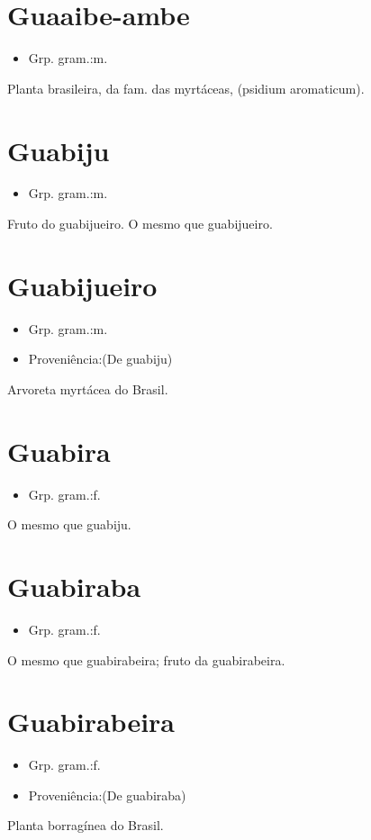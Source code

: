 \section{Guaaibe-ambe}
\begin{itemize}
\item {Grp. gram.:m.}
\end{itemize}
Planta brasileira, da fam. das myrtáceas, (\textunderscore psidium aromaticum\textunderscore ).
\section{Guabiju}
\begin{itemize}
\item {Grp. gram.:m.}
\end{itemize}
Fruto do guabijueiro.
O mesmo que \textunderscore guabijueiro\textunderscore .
\section{Guabijueiro}
\begin{itemize}
\item {Grp. gram.:m.}
\end{itemize}
\begin{itemize}
\item {Proveniência:(De \textunderscore guabiju\textunderscore )}
\end{itemize}
Arvoreta myrtácea do Brasil.
\section{Guabira}
\begin{itemize}
\item {Grp. gram.:f.}
\end{itemize}
O mesmo que \textunderscore guabiju\textunderscore .
\section{Guabiraba}
\begin{itemize}
\item {Grp. gram.:f.}
\end{itemize}
O mesmo que \textunderscore guabirabeira\textunderscore ; fruto da guabirabeira.
\section{Guabirabeira}
\begin{itemize}
\item {Grp. gram.:f.}
\end{itemize}
\begin{itemize}
\item {Proveniência:(De \textunderscore guabiraba\textunderscore )}
\end{itemize}
Planta borragínea do Brasil.
